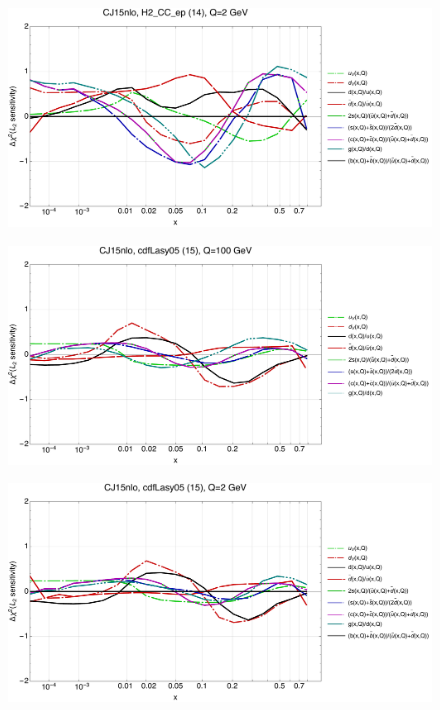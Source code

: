 \documentclass[10pt,aps,prd,floatfix,titlepage]{revtex4}
\begin{document}
\begin{figure}
\includegraphics[width=\textwidth,height=0.44\textheight,keepaspectratio]{2/14_CJ15nlo_q2_Sf_2.pdf}
\caption{}
\end{figure}
\clearpage
\begin{figure}
\includegraphics[width=\textwidth,height=0.44\textheight,keepaspectratio]{2/15_CJ15nlo_q100_Sf_2.pdf}
\caption{}
\end{figure}
\begin{figure}
\includegraphics[width=\textwidth,height=0.44\textheight,keepaspectratio]{2/15_CJ15nlo_q2_Sf_2.pdf}
\caption{}
\end{figure}
\end{document}

